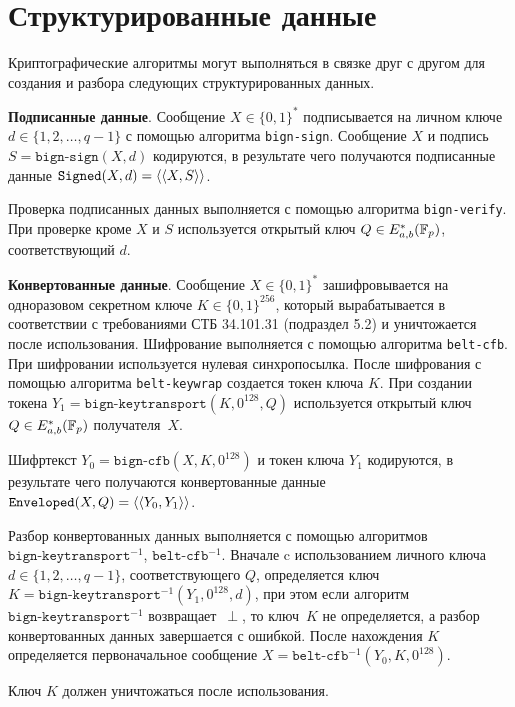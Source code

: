 \section{Структурированные данные}\label{CRYPTO.SignedEnveloped}

Криптографические алгоритмы могут выполняться в связке друг с другом для 
создания и разбора следующих структурированных данных.

{\bf Подписанные данные}.
Сообщение $X \in\{0, 1\}^*$ подписывается на личном ключе 
$d \in\{1, 2,\ldots, q-1\}$ с помощью алгоритма \texttt{bign-sign}.
Сообщение $X$ и подпись $S = \texttt{bign-sign}(X, d)$ кодируются, 
в результате чего получаются подписанные 
данные $\texttt{Signed}(X, d) = \langle\langle X, S \rangle\rangle$.

Проверка подписанных данных выполняется с помощью алгоритма \texttt{bign-verify}.
При проверке кроме $X$ и $S$ используется открытый ключ $Q \in E_{a,b}^*({\mathbb F}_p)$, 
соответствующий $d$.

{\bf Конвертованные данные}.
Сообщение $X\in\{0,1\}^*$ зашифровывается на 
одноразовом секретном ключе $K\in\{0,1\}^{256}$, который вырабатывается в 
соответствии с требованиями СТБ 34.101.31 (подраздел 5.2) и уничтожается после 
использования. Шифрование выполняется с помощью алгоритма \texttt{belt-cfb}. При 
шифровании используется нулевая синхропосылка. После шифрования с помощью 
алгоритма \texttt{belt-keywrap} создается токен ключа $K$.
При создании токена $Y_1 = \texttt{bign-keytransport}(K, 0^{128}, Q)$ 
используется открытый ключ $Q \in E_{a,b}^*({\mathbb F}_p)$ получателя~$X$.

Шифртекст $Y_0 = \texttt{bign-cfb}(X,K,0^{128})$ и токен ключа $Y_1$ 
кодируются, в результате чего получаются конвертованные данные 
$\texttt{Enveloped}(X, Q) = \langle\langle Y_0, Y_1\rangle\rangle$.

Разбор конвертованных данных выполняется с помощью алгоритмов 
$\texttt{bign-keytransport}^{-1}$, $\texttt{belt-cfb}^{-1}$. Вначале c 
использованием личного ключа $d \in\{1, 2,\ldots, q-1\}$, 
соответствующего $Q$, определяется ключ 
$K = \texttt{bign-keytransport}^{-1}(Y_1, 0^{128}, d)$, 
при этом если алгоритм~$\texttt{bign-keytransport}^{-1}$ возвращает~$\perp$, 
то ключ~$K$ не определяется, а разбор конвертованных данных завершается с 
ошибкой. После нахождения $K$ определяется первоначальное сообщение 
$X = \texttt{belt-cfb}^{-1}(Y_0, K, 0^{128})$.

Ключ $K$ должен уничтожаться после использования.
\fi
